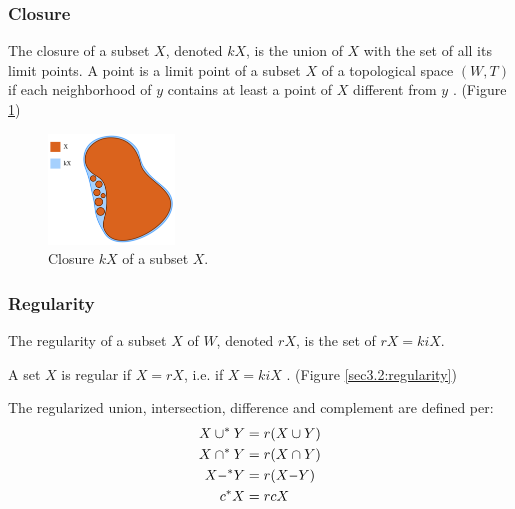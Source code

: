 \documentclass[a4paper,11pt,oneside]{article}
\newcommand{\minus}{\scalebox{0.9}[1.0]{$-$}} %
\begin{document}
\subsubsection{Closure}
    
\begin{definition}
	The closure of a subset $X$, denoted $kX$, is the union of $X$ with the set of all its limit points. A point is a limit point of a subset $X$ of a topological space $(W, T)$ if each neighborhood of $y$ contains at least a point of $X$ different from $y$ \cite{Requicha1978MathematicalFO}. (Figure \ref{sec3.2:closure})
\end{definition}
    
\begin{figure}[ht]
	\begin{center}
		\includegraphics[width=0.3\textwidth]{section3/3.2/closure.png}
	\end{center}
	\caption{Closure $kX$ of a subset $X$.}
	\label{sec3.2:closure}
\end{figure}
    
\subsubsection{Regularity}
    
\begin{definition}[Regularity]
	The regularity of a subset $X$ of $W$, denoted $rX$, is the set of $rX = kiX$. \cite{mansfield_1987}
\end{definition}
\begin{definition}
	A set $X$ is regular if $X = rX$, i.e. if $X = kiX$ \cite{mansfield_1987}. (Figure \ref{sec3.2:regularity}) 
\end{definition}
    
\begin{definition}
	The regularized union, intersection, difference and complement are defined per:
	\begin{align*} 
		X \cup^* Y  & = r(X \cup Y)   \\
		X \cap^* Y  & = r(X \cap Y)   \\
		X \minus^*Y & = r(X \minus Y) \\
		c{^*}X      & = rcX           
	\end{align*}
\end{definition}
    
\end{document}
